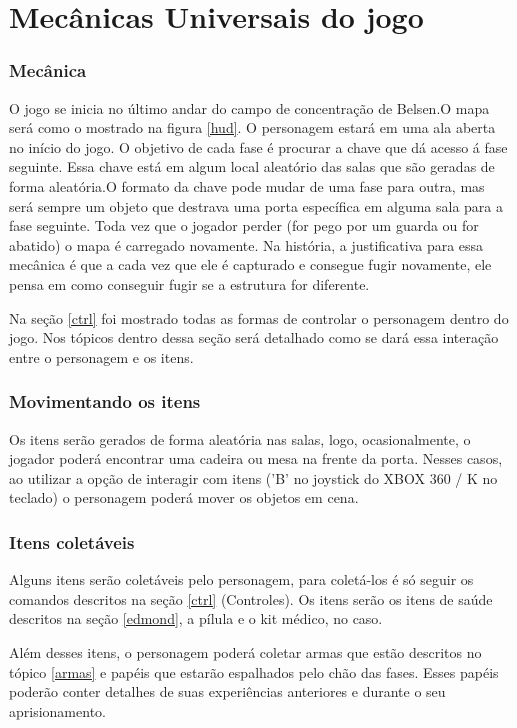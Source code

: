 \part*{Mecânicas Universais do jogo}
\section{Mecânica}
 O jogo se inicia no último andar do campo de concentração de Belsen.O mapa será como o mostrado na figura \ref{hud}. O personagem estará em uma ala aberta no início do jogo. O objetivo de cada fase é procurar a chave que dá acesso á fase seguinte. Essa chave está em algum local aleatório das salas que são geradas de forma aleatória.O formato da chave pode mudar de uma fase para outra, mas será sempre um objeto que destrava uma porta específica em alguma sala para a fase seguinte. Toda vez que o jogador perder (for pego por um guarda ou for abatido) o mapa é carregado novamente. Na história, a justificativa para essa mecânica é que a cada vez que ele é capturado e consegue fugir novamente, ele pensa em como conseguir fugir se a estrutura for diferente.

Na seção \ref{ctrl} foi mostrado todas as formas de controlar o personagem dentro do jogo. Nos tópicos dentro dessa seção será detalhado como se dará essa interação entre o personagem e os itens.

\section{Movimentando os itens}
Os itens serão gerados de forma aleatória nas salas, logo, ocasionalmente, o jogador poderá encontrar uma cadeira ou mesa na frente da porta. Nesses casos, ao utilizar a opção de interagir com itens ('B' no joystick do XBOX 360 / K no teclado) o personagem poderá mover os objetos em cena.

\section{Itens coletáveis}
Alguns itens serão coletáveis pelo personagem, para coletá-los é só seguir os comandos descritos na seção \ref{ctrl} (Controles). Os itens serão os itens de saúde descritos na seção \ref{edmond}, a pílula e o kit médico, no caso.

Além desses itens, o personagem poderá coletar armas que estão descritos no tópico \ref{armas} e papéis que estarão espalhados pelo chão das fases. Esses papéis poderão conter detalhes de suas experiências anteriores e durante o seu aprisionamento.

